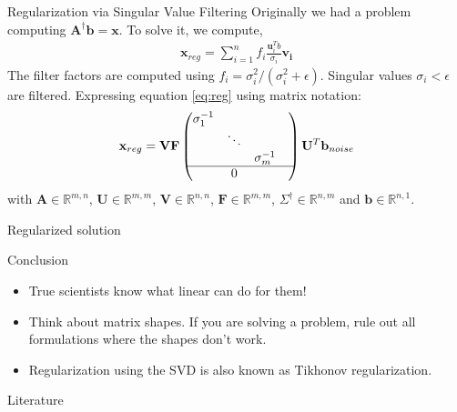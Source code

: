 \documentclass[notes]{beamer}
\begin{document}
  \begin{frame}{Regularization via Singular Value Filtering}
  Originally we had a problem computing $\mathbf{A}^{\dagger}\mathbf{b} = \mathbf{x}$.
  To solve it, we compute,
  \begin{align} \label{eq:reg}
      \mathbf{x}_{reg} = \sum_{i=1}^{n} f_i \frac{\mathbf{u}_i^T b}{\sigma_i}\mathbf{v_i}
  \end{align}
  The filter factors are computed using $f_i = \sigma_i^2 / (\sigma_i^2 + \epsilon)$.
  Singular values $\sigma_i < \epsilon$ are filtered.
  Expressing equation \ref{eq:reg} using matrix notation:
  \begin{align}
    \mathbf{x}_{reg}= \mathbf{V} \mathbf{F} \begin{pmatrix}
      \sigma_1^{-1} & & & \\
      &  \ddots & \\
      &  & \sigma_m^{-1} \\ \hline
      & 0 &
    \end{pmatrix}
    \mathbf{U}^T \mathbf{b}_{noise}
  \end{align}
  with $\mathbf{A} \in \mathbb{R}^{m,n}$, $\mathbf{U} \in \mathbb{R}^{m,m}$, $\mathbf{V} \in \mathbb{R}^{n,n}$, $\mathbf{F} \in \mathbb{R}^{m,m}$, $\Sigma^{\dagger} \in \mathbb{R}^{n,m}$
  and $\mathbf{b} \in \mathbb{R}^{n,1}$.
  \end{frame}

  \begin{frame}{Regularized solution}
    \begin{figure}
      
    \end{figure}
  \end{frame}

  \begin{frame}{Conclusion}
    \begin{itemize}
      \item True scientists know what linear can do for them!
      \item Think about matrix shapes. If you are solving a problem, rule out all formulations where the shapes don't work.
      \item Regularization using the SVD is also known as Tikhonov regularization.
    \end{itemize}
  \end{frame}

  \begin{frame}{Literature}
    \printbibliography
  \end{frame}
\end{document}
